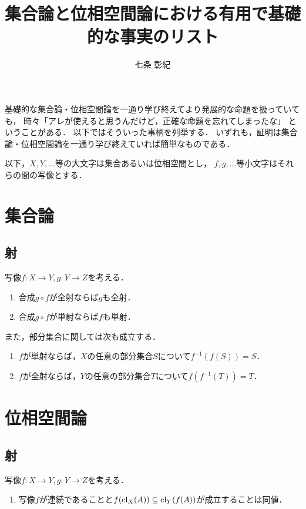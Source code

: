 \documentclass[a4paper]{jarticle}
\title{集合論と位相空間論における有用で基礎的な事実のリスト}
\author{七条 彰紀}
\begin{document}
\maketitle

基礎的な集合論・位相空間論を一通り学び終えてより発展的な命題を扱っていても，
時々「アレが使えると思うんだけど，正確な命題を忘れてしまったな」
ということがある．
以下ではそういった事柄を列挙する．
いずれも，証明は集合論・位相空間論を一通り学び終えていれば簡単なものである．

\begin{screen}
    以下，$X, Y, \dots$等の大文字は集合あるいは位相空間とし，
    $f,g,\dots$等小文字はそれらの間の写像とする．
\end{screen}

\section{集合論}
    \subsection{射}
    写像$f \colon X \to Y, g \colon Y \to Z$を考える．
    \begin{enumerate}
        \item 合成$g \circ f$が全射ならば$g$も全射．
        \item 合成$g \circ f$が単射ならば$f$も単射．
    \end{enumerate}

    また，部分集合に関しては次も成立する．
    \begin{enumerate}
        \item $f$が単射ならば，$X$の任意の部分集合$S$について$f^{-1}(f(S))=S$．
        \item $f$が全射ならば，$Y$の任意の部分集合$T$について$f(f^{-1}(T))=T$．
    \end{enumerate}

\section{位相空間論}
    \subsection{射}
    写像$f \colon X \to Y, g \colon Y \to Z$を考える．
    \begin{enumerate}
        \item 写像$f$が連続であることと$f(\operatorname{cl}_X(A)) \subseteq \operatorname{cl}_Y(f(A))$が成立することは同値．
    \end{enumerate}
\end{document}
